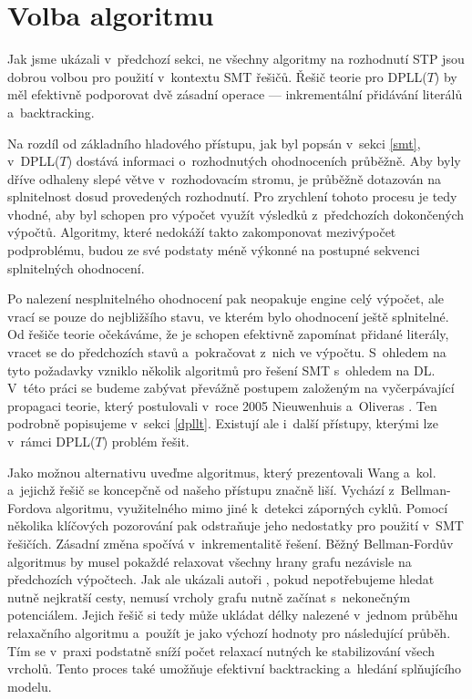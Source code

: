 \section{Volba algoritmu}\label{alg}

Jak jsme ukázali v~předchozí sekci, ne všechny algoritmy na rozhodnutí STP jsou dobrou volbou pro použití v~kontextu SMT řešičů. Řešič teorie pro DPLL($T$) by měl efektivně podporovat dvě zásadní operace --- inkrementální přidávání literálů a~backtracking.

Na rozdíl od základního hladového přístupu, jak byl popsán v~sekci \ref{smt}, v~DPLL($T$) dostává \Solver informaci o~rozhodnutých ohodnoceních průběžně. Aby byly dříve odhaleny slepé větve v~rozhodovacím stromu, \Solver je průběžně dotazován na splnitelnost dosud provedených rozhodnutí. Pro zrychlení tohoto procesu je tedy vhodné, aby byl schopen pro výpočet využít výsledků z~předchozích dokončených výpočtů. Algoritmy, které nedokáží takto zakomponovat mezivýpočet podproblému, budou ze své podstaty méně výkonné na postupné sekvenci splnitelných ohodnocení.

Po nalezení nesplnitelného ohodnocení pak neopakuje engine celý výpočet, ale vrací se pouze do nejbližšího stavu, ve kterém bylo ohodnocení ještě splnitelné. Od řešiče teorie očekáváme, že je schopen efektivně zapomínat přidané literály, vracet se do předchozích stavů a~pokračovat z~nich ve výpočtu. %
S~ohledem na tyto požadavky vzniklo několik algoritmů pro řešení SMT s~ohledem na DL. V~této práci se budeme zabývat převážně postupem založeným na vyčerpávající propagaci teorie, který postulovali v~roce 2005 Nieuwenhuis a~Oliveras \cite{Nieuwenhuis05}. Ten podrobně popisujeme v~sekci \ref{dpllt}. Existují ale i~další přístupy, kterými lze v~rámci DPLL($T$) problém řešit.

Jako možnou alternativu uveďme algoritmus, který prezentovali Wang a~kol. \cite{Wang05} a~jejichž řešič se koncepčně od našeho přístupu značně liší. Vychází z~Bellman-Fordova algoritmu, využitelného mimo jiné k~detekci záporných cyklů. Pomocí několika klíčových pozorování pak odstraňuje jeho nedostatky pro použití v~SMT řešičích. Zásadní změna spočívá v~inkrementalitě řešení. Běžný Bellman-Fordův algoritmus by musel pokaždé relaxovat všechny hrany grafu nezávisle na předchozích výpočtech. Jak ale ukázali autoři \cite{Wang05}, pokud nepotřebujeme hledat nutně nejkratší cesty, nemusí vrcholy grafu nutně začínat s~nekonečným potenciálem. Jejich řešič si tedy může ukládat délky nalezené v~jednom průběhu relaxačního algoritmu a~použít je jako výchozí hodnoty pro následující průběh. Tím se v~praxi podstatně sníží počet relaxací nutných ke stabilizování všech vrcholů. Tento proces také umožňuje efektivní backtracking a~hledání splňujícího modelu.

